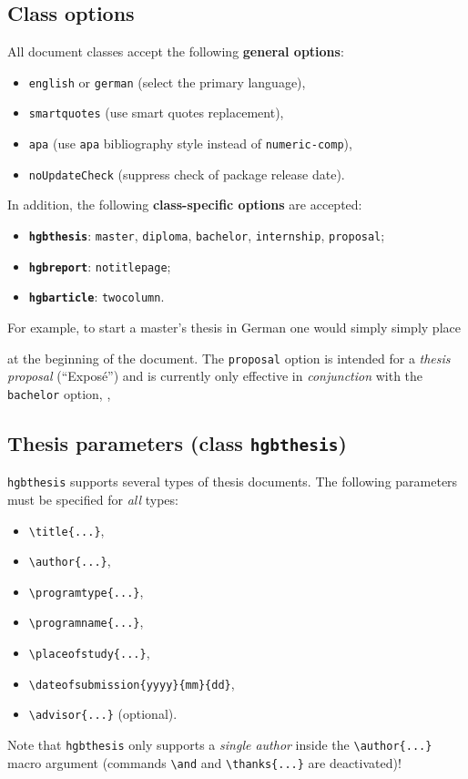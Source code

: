 \documentclass[english]{hgbarticle}
\begin{document}
\subsection{Class options} 
All document classes accept the following \textbf{general options}:
%
\begin{itemize}
    \item \texttt{english} or \texttt{german} (select the primary language),
    \item \texttt{smartquotes} (use smart quotes replacement),
    \item \texttt{apa} (use \texttt{apa} bibliography style instead of
    \texttt{numeric-comp}),
    \item \texttt{noUpdateCheck} (suppress check of package release date).
\end{itemize}
%
In addition, the following \textbf{class-specific options} are accepted:
%
\begin{itemize}
    \item \textbf{\texttt{hgbthesis}}:
    \texttt{master}, \texttt{diploma}, \texttt{bachelor}, \texttt{internship}, \texttt{proposal};
    \item \textbf{\texttt{hgbreport}}: \texttt{notitlepage};
    \item \textbf{\texttt{hgbarticle}}: \texttt{twocolumn}.
\end{itemize}
%
For example, to start a master's thesis in German one would simply simply place
%
%
at the beginning of the document.
The \texttt{proposal} option is intended for a \emph{thesis proposal} (``Exposé'') and is currently 
only effective in \emph{conjunction} with the \texttt{bachelor} option, \eg,
%
%


\subsection{Thesis parameters (class \texttt{hgbthesis})}

\texttt{hgbthesis} supports several types of thesis documents. The following
parameters must be specified for \emph{all} types:
%
\begin{itemize}
    \item \verb!\title{...}!,
    \item \verb!\author{...}!,
    \item \verb!!,
    \item \verb!!,
    \item \verb!!,
    \item \verb!!,
    \item \verb!! (optional).
\end{itemize}
%
Note that \texttt{hgbthesis} only supports a \emph{single author} inside the
\verb!\author{...}! macro argument (commands \verb!\and! and
\verb!\thanks{...}! are deactivated)!
\end{document}
